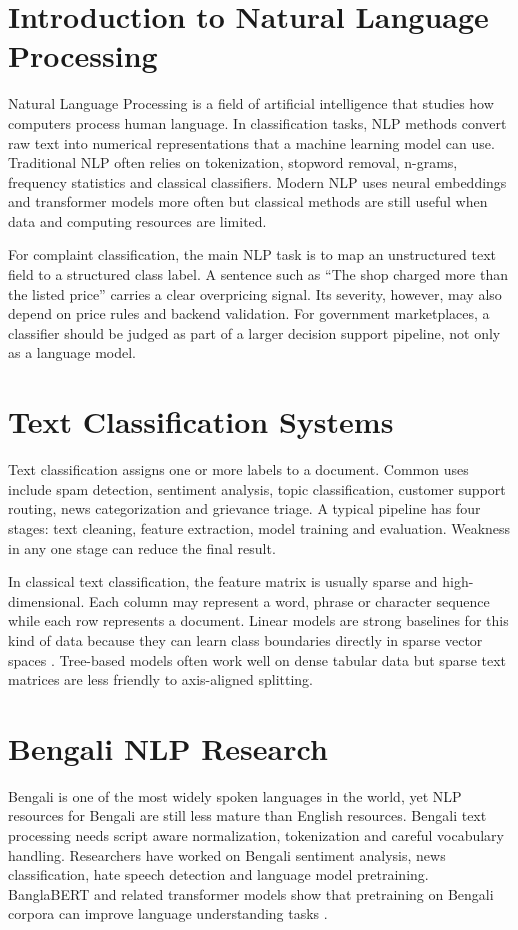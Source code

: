 \documentclass[12pt,a4paper,openany]{book}
\begin{document}
\section{Introduction to Natural Language Processing}
Natural Language Processing is a field of artificial intelligence that studies how computers process human language. In classification tasks, NLP methods convert raw text into numerical representations that a machine learning model can use. Traditional NLP often relies on tokenization, stopword removal, n-grams, frequency statistics and classical classifiers. Modern NLP uses neural embeddings and transformer models more often but classical methods are still useful when data and computing resources are limited.

For complaint classification, the main NLP task is to map an unstructured text field to a structured class label. A sentence such as ``The shop charged more than the listed price'' carries a clear overpricing signal. Its severity, however, may also depend on price rules and backend validation. For government marketplaces, a classifier should be judged as part of a larger decision support pipeline, not only as a language model.

\section{Text Classification Systems}
Text classification assigns one or more labels to a document. Common uses include spam detection, sentiment analysis, topic classification, customer support routing, news categorization and grievance triage. A typical pipeline has four stages: text cleaning, feature extraction, model training and evaluation. Weakness in any one stage can reduce the final result.

In classical text classification, the feature matrix is usually sparse and high-dimensional. Each column may represent a word, phrase or character sequence while each row represents a document. Linear models are strong baselines for this kind of data because they can learn class boundaries directly in sparse vector spaces \cite{joachims1998text}. Tree-based models often work well on dense tabular data but sparse text matrices are less friendly to axis-aligned splitting.

\section{Bengali NLP Research}
Bengali is one of the most widely spoken languages in the world, yet NLP resources for Bengali are still less mature than English resources. Bengali text processing needs script aware normalization, tokenization and careful vocabulary handling. Researchers have worked on Bengali sentiment analysis, news classification, hate speech detection and language model pretraining. BanglaBERT and related transformer models show that pretraining on Bengali corpora can improve language understanding tasks \cite{bhattacharjee2022banglabert}.
\end{document}

